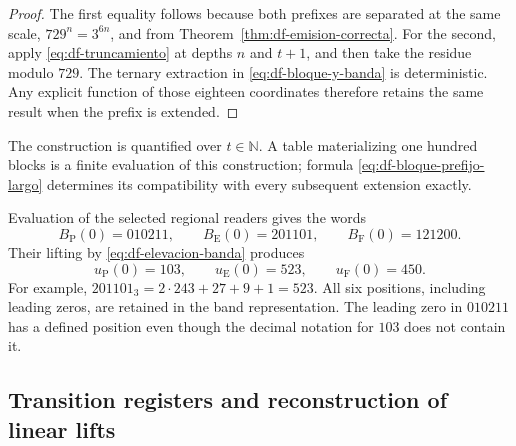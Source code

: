 \begin{proof}
The first equality follows because both prefixes are separated at the same
scale, \(729^n=3^{6n}\), and from
Theorem~\ref{thm:df-emision-correcta}. For the second, apply
\eqref{eq:df-truncamiento} at depths \(n\) and \(t+1\), and then take
the residue modulo \(729\). The ternary extraction in
\eqref{eq:df-bloque-y-banda} is deterministic. Any explicit function of
those eighteen coordinates therefore retains the same result when the
prefix is extended.
\end{proof}

The construction is quantified over \(t\in\mathbb N\). A table
materializing one hundred blocks is a finite evaluation of this
construction; formula \eqref{eq:df-bloque-prefijo-largo} determines its
compatibility with every subsequent extension exactly.

\begin{example}
Evaluation of the selected regional readers gives the words
\[
 B_{\mathrm P}(0)=010211,\qquad
 B_{\mathrm E}(0)=201101,\qquad
 B_{\mathrm F}(0)=121200.
\]
Their lifting by \eqref{eq:df-elevacion-banda} produces
\[
 u_{\mathrm P}(0)=103,\qquad
 u_{\mathrm E}(0)=523,\qquad
 u_{\mathrm F}(0)=450.
\]
For example,
\(201101_3=2\cdot243+27+9+1=523\).
All six positions, including leading zeros, are retained in the band
representation. The leading zero in \(010211\) has a defined position
even though the decimal notation for \(103\) does not contain it.
\end{example}

\subsection{Transition registers and reconstruction of linear lifts}
\label{subsec:df-registros-transicion}


